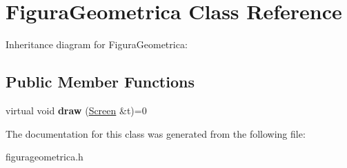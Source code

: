 \hypertarget{class_figura_geometrica}{}\section{Figura\+Geometrica Class Reference}
\label{class_figura_geometrica}


Inheritance diagram for Figura\+Geometrica\+:
\subsection*{Public Member Functions}
\begin{DoxyCompactItemize}
\item 
\mbox{\label{class_figura_geometrica_a8ee8dedc060b6059a805ea091aef2c41}} 
virtual void {\bfseries draw} (\hyperlink{class_screen}{Screen} \&t)=0
\end{DoxyCompactItemize}


The documentation for this class was generated from the following file\+:\begin{DoxyCompactItemize}
\item 
figurageometrica.\+h\end{DoxyCompactItemize}
